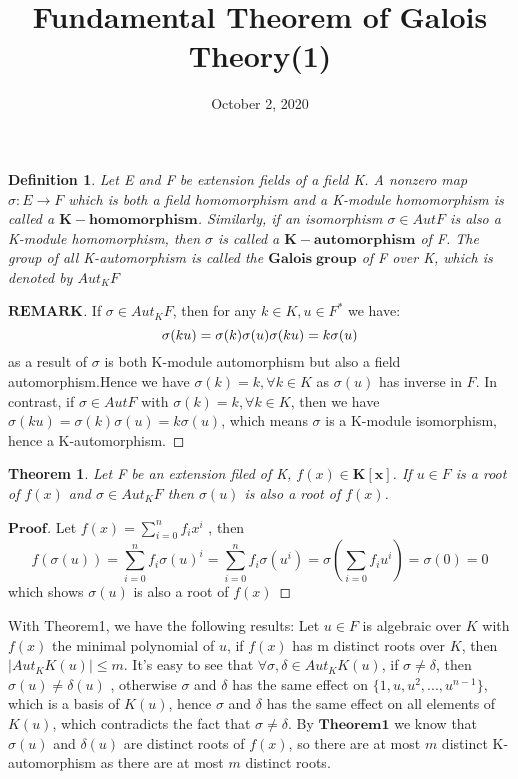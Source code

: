 \documentclass[a4paper, 11pt]{article}
\title{Fundamental Theorem of Galois Theory(1)}
\date{October 2, 2020}
\newtheorem{difinition}{Definition}
\newtheorem{theorem}{Theorem}
\theoremstyle{remark}
\newenvironment{myremark}
{\renewcommand\qedsymbol{$ $}\begin{proof}[$\mathbf{REMARK}$]}
  {\end{proof}}
\newenvironment{myprf}
{\renewcommand\qedsymbol{$ $}\begin{proof}[$\mathbf{Proof}$]}
  {\end{proof}}
\theoremstyle{definition}
\begin{document}
    \maketitle
    \begin{difinition}
            Let E and F be extension fields of a field K. A nonzero map $\sigma:E\rightarrow F$ which is both a field homomorphism and a 
            K-module homomorphism is called a $\mathbf{K-homomorphism}$. Similarly, if an isomorphism $\sigma\in Aut F$ is also a 
            K-module homomorphism, then $\sigma$ is called a $\mathbf{K-automorphism}$ of F. The group of all K-automorphism 
            is called the $\mathbf{Galois\; group}$ of F over K, which is denoted by $Aut_K F$
    \end{difinition}
    \vspace{0.3cm}
    \begin{myremark}
            If $\sigma\in Aut_KF$, then for any $k\in K, u\in F^{*}$ we have:
            $$
            \sigma(ku)=\sigma(k)\sigma(u)\\
            \sigma(ku)=k\sigma(u)
            $$ as a result of $\sigma$ is both K-module automorphism but also a field automorphism.Hence we have $\sigma(k)=k, \forall k\in K$ as $\sigma(u)$ has inverse in $F$.
            In contrast, if $\sigma \in Aut F$ with $\sigma(k)=k, \forall k\in K$, then we have $\sigma(ku)=\sigma(k)\sigma(u)=k\sigma(u)$, which means $\sigma$ is a K-module isomorphism, hence a K-automorphism.
            
    \end{myremark}

    \vspace{0.5cm}
    \begin{theorem}
            Let F be an extension filed of K, $f(x)\in \mathbf{K[x]}$. If $u\in F$
            is a root of $f(x)$ and $\sigma \in Aut_K F$ then $\sigma(u)$ is also a root 
            of $f(x)$.
            
    \end{theorem}
    \vspace{0.3cm}
    \begin{myprf}
            Let $\displaystyle f(x)=\sum_{i=0}^{n}f_i x^i$ , then $$\displaystyle f(\sigma(u))=\sum_{i=0}^{n}f_i \sigma(u)^i
            = \sum_{i=0}^{n}f_i \sigma(u^i) = \sigma(\sum_{i=0}f_i u^i ) = \sigma(0)=0$$
            which shows $\sigma(u)$ is also a root of $f(x)$
    \end{myprf}
    \vspace{0.3cm}
    \indent With Theorem1, we have the following results: Let $u\in F$ is algebraic over $K$
    with $f(x)$ the minimal polynomial of $u$, if $f(x)$ has m distinct roots over $K$,
    then $|Aut_K K(u)|\leq m$. It's easy to see that $\forall \sigma, \delta \in Aut_K K(u)$,
    if $\sigma \neq \delta$, then $\sigma(u)\neq \delta(u)$ , otherwise $\sigma$ and $\delta$ has the same effect on $\{1, u, u^2,...,u^{n-1}\}$, which is a basis of $K(u)$, hence $\sigma$ and $\delta$ has the same effect on all elements of $K(u)$, which contradicts the fact that $\sigma\neq \delta$. By $\textbf{Theorem1}$ we know that $\sigma(u)$ and $\delta(u)$ are distinct roots of $f(x)$, so there are at most $m$ distinct K-automorphism as there are at most $m$ distinct roots.
\end{document}
